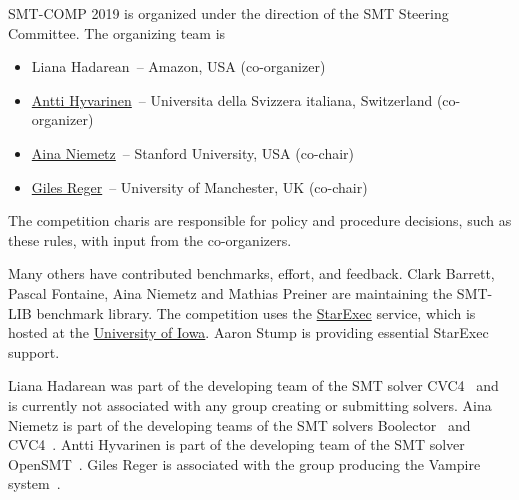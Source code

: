 \documentclass[12pt]{article}
\begin{document}
SMT-COMP 2019 is organized under the direction of the SMT Steering
Committee. The organizing team is
%
\begin{itemize}
\setlength{\itemsep}{0pt}
\item
		Liana Hadarean~-- Amazon, USA (co-organizer)
\item \href{http://www.inf.usi.ch/postdoc/hyvarinen/}{Antti Hyvarinen}~--
		Universita della Svizzera italiana, Switzerland (co-organizer)
\item
  \href{http://cs.stanford.edu/people/niemetz}{Aina
    Niemetz}~-- Stanford University, USA (co-chair)
\item \href{http://www.cs.man.ac.uk/~regerg/}{Giles Reger}~--
  University of Manchester, UK (co-chair)
\end{itemize}
%
The competition charis are responsible for policy and procedure decisions,
such as these rules, with input from the co-organizers.

Many others have contributed benchmarks, effort, and feedback.  Clark Barrett,
Pascal Fontaine, Aina Niemetz and Mathias Preiner are maintaining the SMT-LIB
benchmark library.
The competition uses the
\href{https://www.starexec.org/}{StarExec} service, which is hosted at
the \href{http://www.cs.uiowa.edu/}{University of Iowa}.  Aaron Stump
is providing essential StarExec support.

%
Liana Hadarean was part of the developing team of the SMT solver
CVC4~\cite{cvc4} and is currently not associated with any group
creating or submitting solvers.
Aina Niemetz is part of the developing teams of the SMT solvers
Boolector~\cite{boolector}
and CVC4~\cite{cvc4}.
Antti Hyvarinen is part of the developing team of the SMT solver
OpenSMT~\cite{opensmt2}.
Giles Reger is associated with the group
producing the Vampire system~\cite{vampire}.





\end{document}
